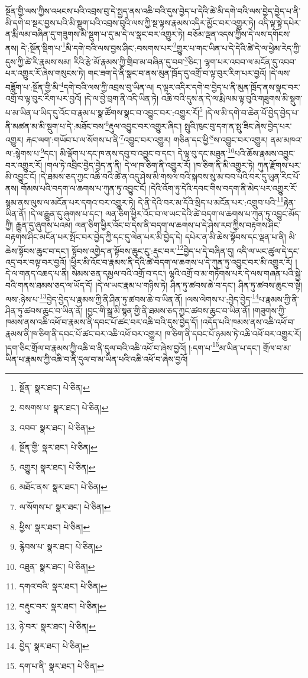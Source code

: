 སྔོན་གྱི་ལས་ཀྱིས་འཕངས་པའི་འབྲས་བུ་དེ་སྤྱད་ནས་འཆི་བའི་དུས་བྱེད་པ་དེའི་ཚེ་མི་དགེ་བའི་ལས་བྱེད་བྱེད་པ་ནི་མི་དགེ་བ་སྔར་བྱས་པའི་མི་སྡུག་པའི་འབྲས་བུའི་ལས་ཀྱི་སྔ་ལྟས་རྣམས་འདིར་མྱོང་བར་འགྱུར་ཏེ། འདི་ལྟ་སྟེ་དཔེར་ན་རྨི་ལམ་བཞིན་དུ་གཟུགས་མི་སྡུག་པ་དུ་མ་དེ་ལ་སྣང་བར་འགྱུར་ཏེ། བཅོམ་ལྡན་འདས་ཀྱིས་དེ་ལས་དགོངས་ནས། དེ་:སྔོན་སྡིག་པ་\footnote{སྔོན་  སྣར་ཐང་།  པེ་ཅིན། }མི་དགེ་བའི་ལས་བྱས་ཤིང་:བསགས་པར་\footnote{བསགས་པ་  སྣར་ཐང་།  པེ་ཅིན། }གྱུར་པ་གང་ཡིན་པ་དེ་དེའི་ཚེ་དེ་ལ་ཕྱེམ་རེད་ཀྱི་དུས་ཀྱི་ཚེ་རི་རྣམས་སམ། རིའི་རྩེ་མོ་རྣམས་ཀྱི་གྲིབ་མ་བཞིན་དུ་བབ་\footnote{འབབ་  སྣར་ཐང་།  པེ་ཅིན། }ཅིང་། ལྷག་པར་འབབ་ལ་མངོན་དུ་འབབ་པར་འགྱུར་རོ་ཞེས་གསུངས་ཏེ། གང་ཟག་དེ་ནི་སྣང་བ་ནས་མུན་ཁྲོད་དུ་འགྲོ་བ་ལྟ་བུར་རིག་པར་བྱའོ། །དེ་ལས་བཟློག་པ་:སྔོན་གྱི་མི་\footnote{སྔོན་གྱི་  སྣར་ཐང་།  པེ་ཅིན། }དགེ་བའི་ལས་ཀྱི་འབྲས་བུ་ཡིན་ལ། ད་ལྟར་འདིར་དགེ་བ་བྱེད་པ་ནི་མུན་ཁྲོད་ནས་སྣང་བར་འགྲོ་བ་ལྟ་བུར་རིག་པར་བྱའོ། །དེ་ལ་བྱེ་བྲག་ནི་འདི་ཡིན་ཏེ། འཆི་བའི་དུས་ན་དེ་ལ་རྨི་ལམ་ལྟ་བུའི་གཟུགས་མི་སྡུག་པ་མ་ཡིན་པ་ཡིད་དུ་འོང་བ་རྣམ་པ་སྣ་ཚོགས་སྣང་བ་འབྱུང་བར་:འགྱུར་རོ།\footnote{འགྱུར།  སྣར་ཐང་།  པེ་ཅིན། } །དེ་ལ་མི་དགེ་བ་ཆེན་པོ་བྱེད་བྱེད་པ་ནི་མཚན་མ་མི་སྡུག་པ་དེ་:མཐོང་བས་\footnote{མཐོང་ནས་  སྣར་ཐང་།  པེ་ཅིན། }རྡུལ་འབྱུང་བར་འགྱུར་ཞིང་། སྤུའི་ཁུང་བུ་དག་ན་སྤུ་ཟིང་ཞེས་བྱེད་པར་འགྱུར། རྐང་ལག་:གཡོབ་པ་ལ་སོགས་པ་ནི་\footnote{ལ་སོགས་པ་  སྣར་ཐང་།  པེ་ཅིན། }འབྱུང་བར་འགྱུར། གཅིན་དང་ཕྱི་\footnote{ཕྱིས་  སྣར་ཐང་།  པེ་ཅིན། }ས་འབྱུང་བར་འགྱུར། ནམ་མཁའ་ལ་:སྙེགས་པ་\footnote{རྙེབས་པ་  སྣར་ཐང་།  པེ་ཅིན། }དང་། མི་ལྡོག་པ་དང་ཁ་ནས་དབུ་བ་འབྱུང་བ་དང་། དེ་ལྟ་བུ་དང་མཐུན་\footnote{འཐུན་  སྣར་ཐང་།  པེ་ཅིན། }པའི་ཆོས་རྣམས་འབྱུང་བར་འགྱུར་རོ། །གལ་ཏེ་འབྲིང་བྱེད་བྱེད་ན་ནི། དེ་ལ་ཁ་ཅིག་ནི་འགྱུར་རོ། །ཁ་ཅིག་ནི་མི་འགྱུར་ཏེ། ཀུན་རྫོགས་པར་མི་འབྱུང་ངོ། །དེ་ཐམས་ཅད་ཀྱང་འཆི་བའི་ཚེ་ན་འདུ་ཤེས་མི་གསལ་བའི་སྐབས་སུ་མ་བབ་པའི་བར་དུ་ཡུན་རིང་པོ་ནས། གོམས་པའི་བདག་ལ་ཆགས་པ་ཀུན་ཏུ་འབྱུང་ངོ། །དེའི་འོག་ཏུ་དེའི་དབང་གིས་བདག་ནི་མེད་པར་འགྱུར་རོ་སྙམ་ནས་ལུས་ལ་མངོན་པར་དགའ་བར་འགྱུར་ཏེ། དེ་ནི་དེའི་བར་མ་དོའི་སྲིད་པ་མངོན་པར་:འགྲུབ་པའི་\footnote{དགའ་བའི་  སྣར་ཐང་།  པེ་ཅིན། }རྟེན་ཡིན་ནོ། །དེ་ལ་རྒྱུན་དུ་ཞུགས་པ་དང་། ལན་ཅིག་ཕྱིར་འོང་བ་ལ་ཡང་དེའི་ཚེ་བདག་ལ་ཆགས་པ་ཀུན་ཏུ་འབྱུང་མོད་ཀྱི། རྒྱུན་དུ་ཞུགས་པའམ། ལན་ཅིག་ཕྱིར་འོང་བ་དེས་ནི་བདག་ལ་ཆགས་པ་དེ་ཤེས་རབ་ཀྱིས་བརྟགས་ཤིང་བརྟགས་ཤིང་མངོན་པར་སྤོང་བར་བྱེད་ཀྱི་དང་དུ་ལེན་པར་མི་བྱེད་དེ། དཔེར་ན་མི་ཆེས་སྟོབས་དང་ལྡན་པ་ནི། མི་ཆེས་སྟོབས་ཆུང་བ་དང་། སྟོབས་འགྱེད་ན་སྟོབས་ཆུང་ངུ་:རྡུང་བར་\footnote{བརྡུང་བར་  སྣར་ཐང་།  པེ་ཅིན། }བྱེད་པ་དེ་བཞིན་དུ། འདི་ལ་ཡང་ཚུལ་དེ་དང་འདྲ་བར་བལྟ་བར་བྱའོ། །ཕྱིར་མི་འོང་བ་རྣམས་ནི་དེའི་ཚེ་བདག་ལ་ཆགས་པ་དེ་ཀུན་ཏུ་འབྱུང་བར་མི་འགྱུར་རོ། །དེ་ལ་གནད་འཆད་པ་ནི། སེམས་ཅན་དམྱལ་བའི་འགྲོ་བ་དང་། ལྷའི་འགྲོ་བ་མ་གཏོགས་པར་དེ་ལས་གཞན་པའི་སྐྱེ་བའི་གནས་ཐམས་ཅད་ལ་ཡོད་དོ། །དེ་ལ་ཡང་རྣམ་པ་གཉིས་ཏེ། ཤིན་ཏུ་ཚབས་ཆེ་བ་དང་། ཤིན་ཏུ་ཚབས་ཆུང་བ་སྟེ། ལས་:ཉེས་པ་\footnote{ཉེ་བར་  སྣར་ཐང་།  པེ་ཅིན། }བྱེད་བྱེད་པ་རྣམས་ཀྱི་ནི་ཤིན་ཏུ་ཚབས་ཆེ་བ་ཡིན་ནོ། །ལས་ལེགས་པ་:བྱེད་བྱེད་\footnote{བྱེད་  སྣར་ཐང་།  པེ་ཅིན། }པ་རྣམས་ཀྱི་ནི་ཤིན་ཏུ་ཚབས་ཆུང་བ་ཡིན་ནོ། །བྱང་གི་སྒྲ་མི་སྙན་གྱི་ནི་ཐམས་ཅད་ཀྱང་ཚབས་ཆུང་བ་ཡིན་ནོ། །གཟུགས་ཀྱི་ཁམས་ནས་འཆི་འཕོ་བ་རྣམས་ནི་དབང་པོ་ཚང་བར་འཆི་བའི་དུས་བྱེད་དོ། །འདོད་པའི་ཁམས་ནས་འཆི་འཕོ་བ་རྣམས་ནི་ཁ་ཅིག་ནི་དབང་པོ་ཚང་བར་འཆི་འཕོ་བར་འགྱུར། ཁ་ཅིག་ནི་དབང་པོ་ཉམས་ཏེ་འཆི་འཕོ་བར་འགྱུར་རོ། །དག་ཅིང་གྲོལ་བ་རྣམས་ཀྱི་འཆི་བ་ནི་དུལ་བའི་འཆི་འཕོ་བ་ཞེས་བྱའོ། །:དག་པ་\footnote{དག་པ་ནི་  སྣར་ཐང་།  པེ་ཅིན། }མ་ཡིན་པ་དང་། གྲོལ་བ་མ་ཡིན་པ་རྣམས་ཀྱི་འཆི་བ་ནི་དུལ་བ་མ་ཡིན་པའི་འཆི་འཕོ་བ་ཞེས་བྱའོ། 